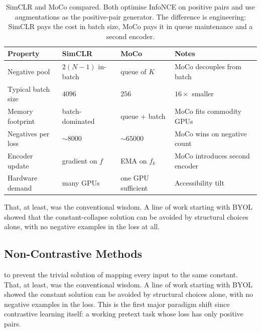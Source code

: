 \begin{table}[ht]
\centering
\begin{tabular}{p{}p{}p{}p{}}
    \toprule
    \textbf{Property} & \textbf{SimCLR} & \textbf{MoCo} & \textbf{Notes} \\
    \midrule
    Negative pool       & $2(N-1)$ in-batch & queue of $K$         & MoCo decouples from batch \\
    Typical batch size  & $4096$            & $256$                & $16\times$ smaller \\
    Memory footprint    & batch-dominated   & queue + batch        & MoCo fits commodity GPUs \\
    Negatives per loss  & $\sim 8000$       & $\sim 65000$         & MoCo wins on negative count \\
    Encoder update      & gradient on $f$   & EMA on $f_k$         & MoCo introduces second encoder \\
    Hardware demand     & many GPUs         & one GPU sufficient   & Accessibility tilt \\
    \bottomrule
\end{tabular}
\vspace{2em}
\caption{SimCLR and MoCo compared. Both optimise InfoNCE on positive pairs and use augmentations as the positive-pair generator. The difference is engineering: SimCLR pays the cost in batch size, MoCo pays it in queue maintenance and a second encoder.}
\label{tab:simclr_vs_moco}
\end{table}

That, at least, was the conventional wisdom.
A line of work starting with BYOL showed that the constant-collapse solution can be avoided by structural choices alone, with no negative examples in the loss at all.


\subsection{Non-Contrastive Methods}


 to prevent the trivial solution of mapping every input to the same constant.
That, at least, was the conventional wisdom.
A line of work starting with BYOL showed the constant solution can be avoided by structural choices alone, with no negative examples in the loss.
This is the first major paradigm shift since contrastive learning itself: a working pretext task whose loss has only positive pairs.

